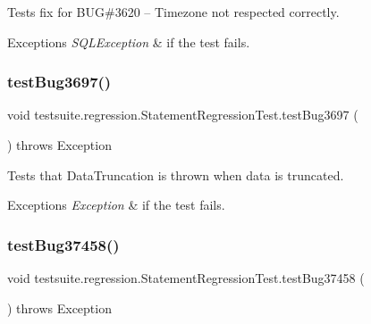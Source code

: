 Tests fix for B\+UG\#3620 -- Timezone not respected correctly.


\begin{DoxyExceptions}{Exceptions}
{\em S\+Q\+L\+Exception} & if the test fails. \\
\hline
\end{DoxyExceptions}
\mbox{\label{classtestsuite_1_1regression_1_1_statement_regression_test_a2977c93f45f1a9ec78b20348f2d4e290}} 
\subsubsection{\texorpdfstring{test\+Bug3697()}{testBug3697()}}
{\footnotesize\ttfamily void testsuite.\+regression.\+Statement\+Regression\+Test.\+test\+Bug3697 (\begin{DoxyParamCaption}{ }\end{DoxyParamCaption}) throws Exception}

Tests that Data\+Truncation is thrown when data is truncated.


\begin{DoxyExceptions}{Exceptions}
{\em Exception} & if the test fails. \\
\hline
\end{DoxyExceptions}
\mbox{\label{classtestsuite_1_1regression_1_1_statement_regression_test_a58a021ee89bb1a822729f1cafec75c37}} 
\subsubsection{\texorpdfstring{test\+Bug37458()}{testBug37458()}}
{\footnotesize\ttfamily void testsuite.\+regression.\+Statement\+Regression\+Test.\+test\+Bug37458 (\begin{DoxyParamCaption}{ }\end{DoxyParamCaption}) throws Exception}

